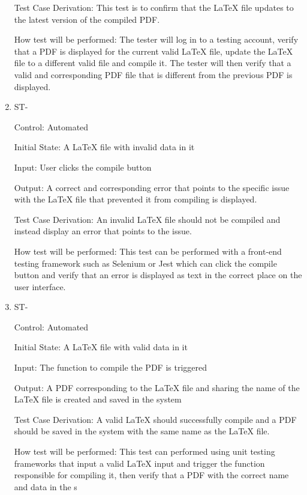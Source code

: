 \documentclass[12pt, titlepage]{article}
\newcounter{TESTID}
\newcommand\TESTNUM{\stepcounter{TESTID}\theTESTID}
\begin{document}
\begin{enumerate}
		Test Case Derivation: This test is to confirm that the LaTeX file updates to the latest version of the compiled PDF.
		
		How test will be performed: The tester will log in to a testing account, verify that a PDF is displayed for the current valid LaTeX file, update the LaTeX file to a different valid file and compile it. The tester will then verify that a valid and corresponding PDF file that is different from the previous PDF is displayed.
		
		\item{ST-\TESTNUM\\}
		
		Control: Automated
		
		Initial State: A LaTeX file with invalid data in it
		
		Input: User clicks the compile button
		
		Output: A correct and corresponding error that points to the specific issue with the LaTeX file that prevented it from compiling is displayed.
		
		Test Case Derivation: An invalid LaTeX file should not be compiled and instead display an error that points to the issue.
		
		How test will be performed: This test can be performed with a front-end testing framework such as Selenium or Jest which can click the compile button and verify that an error is displayed as text in the correct place on the user interface.
		
		\item{ST-\TESTNUM\\}
		
		Control: Automated
		
		Initial State: A LaTeX file with valid data in it
		
		Input: The function to compile the PDF is triggered
		
		Output: A PDF corresponding to the LaTeX file and sharing the name of the LaTeX file is created and saved in the system
		
		Test Case Derivation: A valid LaTeX should successfully compile and a PDF should be saved in the system with the same name as the LaTeX file.
		
		How test will be performed: This test can performed using unit testing frameworks that input a valid LaTeX input and trigger the function responsible for compiling it, then verify that a PDF with the correct name and data in the s 
		
	\end{enumerate}
	
\end{document}
